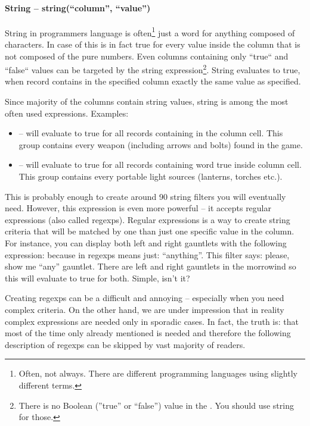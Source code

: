 \paragraph{String -- string(``column'', ``value'')}
String in programmers language is often\footnote{Often, not always. There are different programming languages using slightly different terms.}
just a word for anything composed of characters. In case of \OCS{} this is in fact true for every value inside the column that is not composed
of the pure numbers. Even columns containing only ``true`` and ``false`` values can be targeted by the string expression\footnote{There is no
Boolean (''true'' or ``false'') value in the \OCS. You should use string for those.}. String evaluates to true, 
when record contains in the specified column exactly the same value as specified.

Since majority of the columns contain string values, string is among the most often used expressions. Examples:
\begin{itemize}
 \item {} -- will evaluate to true for all records containing  in the  column cell.
 This group contains every weapon (including arrows and bolts) found in the game.
 \item {} -- will evaluate to true for all records containing word true inside  column cell.
 This group contains every portable light sources (lanterns, torches etc.).
\end{itemize}
This is probably enough to create around 90 string filters you will eventually need. However, this expression is even more powerful
-- it accepts regular expressions (also called regexps). Regular expressions is a way to create string criteria that will be matched 
by one than just one specific value in the column. For instance, you can display both left and right gauntlets with the following expression:
 because  in regexps means just: ``anything''. This filter says: please, show me ``any'' gauntlet.
There are left and right gauntlets in the morrowind so this will evaluate to true for both. Simple, isn't it?

Creating regexps can be a difficult and annoying -- especially when you need complex criteria. On the other hand, we are under impression
that in reality complex expressions are needed only in sporadic cases. In fact, the truth is: that most of the time only already mentioned
 is needed and therefore the following description of regexps can be skipped by vast majority of readers.

